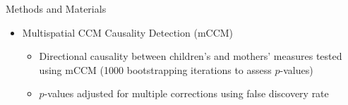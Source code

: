 \documentclass[final]{beamer}
\begin{document}
\begin{frame}{}
\begin{textblock}{34}
\begin{block}{Methods and Materials}
\begin{itemize}
\begin{itemize}
\end{itemize}
\end{itemize}
\begin{itemize}
\item \text{ }Multispatial CCM Causality Detection (mCCM) \cite{Clark15}
\begin{itemize}
\item \text{ }Directional causality between children's and mothers' measures tested using mCCM  (1000 bootstrapping iterations to assess $p$-values)
\item \text{ }$p$-values adjusted for multiple corrections using false discovery rate \cite{Benjamini01}
\end{itemize}
\end{itemize}
\end{block}


\end{textblock}
\end{frame}
\end{document}
